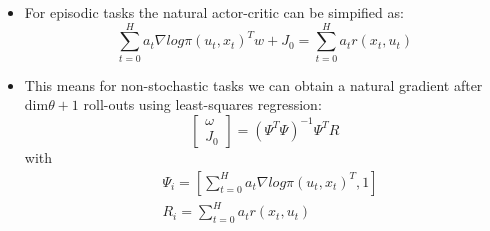 {\begin{pcolumn}
\vspace*{-28mm}
%
{\large
\begin{itemize}
	\item For episodic tasks the natural actor-critic can be simpified as:
\begin{equation}
	\sum_{t=0}^H a_t \nabla log \pi(u_t, x_t)^Tw + J_0 = \sum_{t=0}^H a_t r(x_t, u_t)
\end{equation}
	\item This means for non-stochastic tasks we can obtain a natural gradient after dim$\theta + 1$ roll-outs using least-squares regression:
\begin{equation}
	\left[
	\begin{matrix}
		\omega \\
		J_0
	\end{matrix}
	\right] = (\Psi^T \Psi)^{-1}\Psi^T R
\end{equation}
with
\begin{eqnarray}
	& \Psi_i = \left[\sum_{t=0}^{H}a_t \nabla log \pi (u_t, x_t)^T, 1 \right] \\
	& R_i = \sum_{t=0}^{H}a_t r(x_t, u_t)
\end{eqnarray}


\end{itemize}}
\end{pcolumn}}
